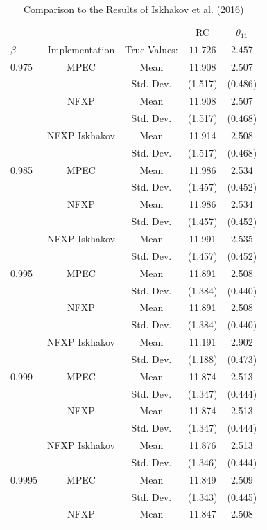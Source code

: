 \begin{table}[!t]
	\label{table5}
	\centering
	\caption{Comparison to the Results of Iskhakov et al. (2016)}
	\begin{tabular}{l c c c c}
		\toprule\midrule
		& & & RC & $\theta_{11}$ \\
		\cmidrule{4-5}
		$\beta$ & Implementation & True Values: & $\mathbf{11.726}$ & $\mathbf{2.457}$ \\ \midrule
		0.975 & MPEC & Mean & 11.908 & 2.507 \\
		& & Std. Dev. & (1.517) & (0.486) \\
		& NFXP & Mean & 11.908 & 2.507 \\
		& & Std. Dev. & (1.517) & (0.468) \\
		& NFXP Iskhakov & Mean & 11.914 & 2.508 \\
		& & Std. Dev. & (1.517) & (0.468) \\ \midrule
		0.985 & MPEC & Mean & 11.986 & 2.534 \\
		& & Std. Dev. & (1.457) & (0.452) \\
		& NFXP & Mean & 11.986 & 2.534 \\
		& & Std. Dev. & (1.457) & (0.452) \\
		& NFXP Iskhakov & Mean & 11.991 & 2.535 \\
		& & Std. Dev. & (1.457) & (0.452) \\ \midrule
		0.995 & MPEC & Mean & 11.891 & 2.508 \\
		& & Std. Dev. & (1.384) & (0.440) \\
		& NFXP & Mean & 11.891 & 2.508 \\
		& & Std. Dev. & (1.384) & (0.440) \\
		& NFXP Iskhakov & Mean & 11.191	& 2.902 \\
		& & Std. Dev. & (1.188) & (0.473) \\ \midrule
		0.999 & MPEC & Mean & 11.874 & 2.513 \\
		& & Std. Dev. & (1.347) & (0.444) \\
		& NFXP & Mean & 11.874 & 2.513 \\
		& & Std. Dev. & (1.347) & (0.444) \\
		& NFXP Iskhakov & Mean & 11.876	& 2.513 \\
		& & Std. Dev. & (1.346) & (0.444) \\ \midrule
		0.9995 & MPEC & Mean & 11.849 & 2.509 \\
		& & Std. Dev. & (1.343) & (0.445) \\
		& NFXP & Mean & 11.847 & 2.508 \\

\end{tabular}
\end{table}
